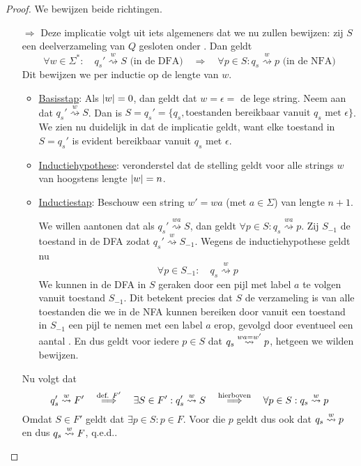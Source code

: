 \documentclass[../aanvullingen_cursus.tex]{subfiles}
\begin{document}
\begin{proof}
	We bewijzen beide richtingen.
	\begin{enumerate}
		\item[\( \Rightarrow \)] Deze implicatie volgt uit iets algemeners dat we nu zullen bewijzen: zij \(S\) een deelverzameling van \( Q \) gesloten onder \epsilonbogen. Dan geldt \[ \forall w \in \Sigma^*: \quad q_{s}' \overset{w}{\rightsquigarrow} S \text{ (in de DFA)} \quad \Longrightarrow \quad \forall p \in S: q_s \overset{w}{\rightsquigarrow} p \text{ (in de NFA)}  \] Dit bewijzen we per inductie op de lengte van \( w \).
		\begin{itemize}
			\item \underline{Basisstap}: Als \(\lvert w \rvert=0\), dan geldt dat \(w = \epsilon = \) de lege string. Neem aan dat \(q_{s}' \overset{w}{\rightsquigarrow} S\). Dan is \(S=q_s'=\{q_s, \text{toestanden bereikbaar vanuit }q_s \text{ met }\epsilon\}\). We zien nu duidelijk in dat de implicatie geldt, want elke toestand in \(S=q_s'\) is evident bereikbaar vanuit \(q_s\) met \(\epsilon\).
			\item \underline{Inductiehypothese}: veronderstel dat de stelling geldt voor alle strings \(w\) van hoogstens lengte \(\lvert w \rvert=n\).
			\item \underline{Inductiestap}: Beschouw een string \(w' = wa \) (met \(a \in \Sigma\)) van lengte \(n+1\).

			We willen aantonen dat als \(q_{s}' \overset{wa}{\rightsquigarrow} S\), dan geldt \(\forall p \in S: q_s \overset{wa}{\rightsquigarrow} p\). Zij \(S_{-1}\) de toestand in de DFA zodat \(q_{s}' \overset{w}{\rightsquigarrow} S_{-1}\). Wegens de inductiehypothese geldt nu \[ \forall p\in S_{-1}: \quad q_s \overset{w}{\rightsquigarrow} p\]We kunnen in de DFA in \(S\) geraken door een pijl met label \(a\) te volgen vanuit toestand \(S_{-1}\). Dit betekent precies dat \(S\) de verzameling is van alle toestanden die we in de NFA kunnen bereiken door vanuit een toestand in \(S_{-1}\) een pijl te nemen met een label \(a\) erop, gevolgd door eventueel een aantal \epsilonbogen. En dus geldt voor iedere \(p \in S\) dat \(q_s \overset{wa=w'}{\rightsquigarrow} p \), hetgeen we wilden bewijzen.
		\end{itemize}

		Nu volgt dat \[q_s'\overset{w}{\rightsquigarrow}F' \quad \overset{\text{def. }F'}{\Longrightarrow} \quad \exists S \in F': q_s' \overset{w}{\rightsquigarrow} S \quad \overset{\text{hierboven}}{\Longrightarrow} \quad \forall p \in S: q_s \overset{w}{\rightsquigarrow} p\]
		Omdat \(S\in F'\) geldt dat \(\exists p \in S : p \in F\). Voor die \(p\) geldt dus ook dat \(q_s \overset{w}{\rightsquigarrow} p\) en dus \(q_s \overset{w}{\rightsquigarrow} F\), q.e.d..


\end{enumerate}
\end{proof}
\end{document}
